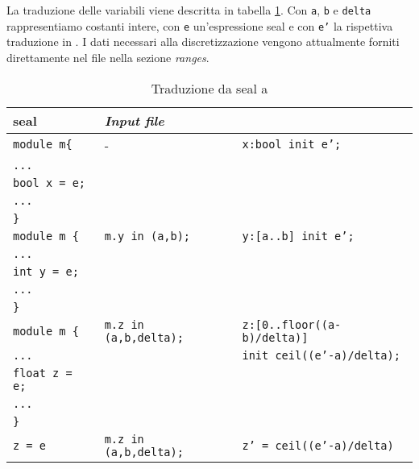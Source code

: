La traduzione delle variabili viene descritta in tabella \ref{tab:sealtoprism}. Con \texttt{a}, \texttt{b} e \texttt{delta} rappresentiamo costanti intere, con \texttt{e} un'espressione \ac{seal} e con \texttt{e'} la rispettiva traduzione in \prism{}. I dati necessari alla discretizzazione vengono attualmente forniti direttamente nel file \prism{} nella sezione \emph{ranges}.
\begin{table}[htbp!]
\centering
\begin{tabular}{|l|l|l|}
	\hline
	\ac{seal} & \emph{Input file} &\prism{} \\
	\hline
	\texttt{module m\{} & - & \texttt{x:bool init e';} \\
	\texttt{...} & & \\
	\texttt{bool x = e;}  & & \\
	\texttt{...} & & \\
	\texttt{\}} & & \\
	\hline
	\texttt{module m \{} & \texttt{m.y in (a,b);} & \texttt{y:[a..b] init e';} \\
	\texttt{...} & & \\
	\texttt{int y = e;} & & \\
	\texttt{...} & & \\
	\texttt{\}} & & \\
	\hline
	\texttt{module m \{} & \texttt{m.z in (a,b,delta);} & \texttt{z:[0..floor((a-b)/delta)]} \\
	\texttt{...} & & \texttt{init ceil((e'-a)/delta);} \\
	\texttt{float z = e;} & & \\
	\texttt{...} & & \\
	\texttt{\}} & & \\
	\hline
	\texttt{z = e} & \texttt{m.z in (a,b,delta);} & \texttt{z' = ceil((e'-a)/delta)} \\
	\hline
\end{tabular}
\caption{Traduzione da \ac{seal} a \prism{}}
\label{tab:sealtoprism}
\end{table}
